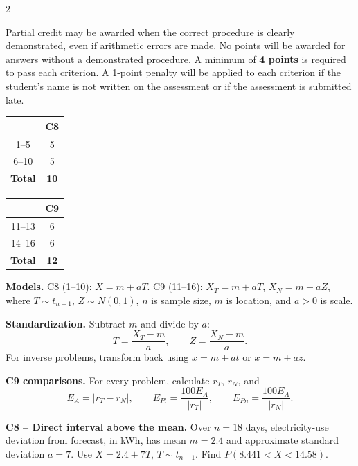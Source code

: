 \begin{multicols}{2}

Partial credit may be awarded when the correct procedure is clearly demonstrated, even if arithmetic errors are made. No points will be awarded for answers without a demonstrated procedure. A minimum of \textbf{4 points} is required to pass each criterion. A 1-point penalty will be applied to each criterion if the student's name is not written on the assessment or if the assessment is submitted late.

\vspace{-4mm}
\begin{center}
	\begin{tabular}{|c|c|}
		\hline
		\textbf{\textnumero} & \textbf{C8} \\ \hline
		1--5 & 5 \\ \hline
		6--10 & 5 \\ \hline
		\textbf{Total} & \textbf{10} \\ \hline
	\end{tabular}
	\hspace{1cm}
	\begin{tabular}{|c|c|}
		\hline
		\textbf{\textnumero} & \textbf{C9} \\ \hline
		11--13 & 6 \\ \hline
		14--16 & 6 \\ \hline
		\textbf{Total} & \textbf{12} \\ \hline
	\end{tabular}
\end{center}
\vspace{-4mm}




\textbf{Models.} C8 (1--10): $X=m+aT$.
C9 (11--16): $X_T=m+aT$, $X_N=m+aZ$, where
$T\sim t_{n-1}$, $Z\sim N(0,1)$, $n$ is sample size,
$m$ is location, and $a>0$ is scale.

\textbf{Standardization.} Subtract $m$ and divide by $a$:
\[
T=\frac{X_T-m}{a},\qquad Z=\frac{X_N-m}{a}.
\]
For inverse problems, transform back using
$x=m+at$ or $x=m+az$.

\textbf{C9 comparisons.} For every problem, calculate
$r_T$, $r_N$, and
\[
E_A=|r_T-r_N|,\qquad
E_{Pt}=\frac{100E_A}{|r_T|},\qquad
E_{Pn}=\frac{100E_A}{|r_N|}.
\]


\textbf{C8 -- Direct interval above the mean.} Over $n=18$ days, electricity-use deviation from forecast, in kWh, has mean $m=2.4$ and approximate standard deviation $a=7$. Use $X=2.4+7T$, $T\sim t_{n-1}$.
Find $P(8.441<X<14.58)$. 


\end{multicols}
